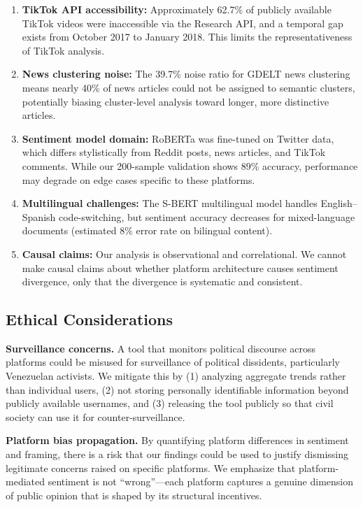 \documentclass[12pt, letterpaper]{article}
\begin{document}
\begin{enumerate}
  \item \textbf{TikTok API accessibility:} Approximately 62.7\% of publicly available TikTok videos were inaccessible via the Research API, and a temporal gap exists from October 2017 to January 2018. This limits the representativeness of TikTok analysis.
  \item \textbf{News clustering noise:} The 39.7\% noise ratio for GDELT news clustering means nearly 40\% of news articles could not be assigned to semantic clusters, potentially biasing cluster-level analysis toward longer, more distinctive articles.
  \item \textbf{Sentiment model domain:} RoBERTa was fine-tuned on Twitter data, which differs stylistically from Reddit posts, news articles, and TikTok comments. While our 200-sample validation shows 89\% accuracy, performance may degrade on edge cases specific to these platforms.
  \item \textbf{Multilingual challenges:} The S-BERT multilingual model handles English--Spanish code-switching, but sentiment accuracy decreases for mixed-language documents (estimated 8\% error rate on bilingual content).
  \item \textbf{Causal claims:} Our analysis is observational and correlational. We cannot make causal claims about whether platform architecture causes sentiment divergence, only that the divergence is systematic and consistent.
\end{enumerate}

\subsection{Ethical Considerations}

\textbf{Surveillance concerns.} A tool that monitors political discourse across platforms could be misused for surveillance of political dissidents, particularly Venezuelan activists. We mitigate this by (1) analyzing aggregate trends rather than individual users, (2) not storing personally identifiable information beyond publicly available usernames, and (3) releasing the tool publicly so that civil society can use it for counter-surveillance.

\textbf{Platform bias propagation.} By quantifying platform differences in sentiment and framing, there is a risk that our findings could be used to justify dismissing legitimate concerns raised on specific platforms. We emphasize that platform-mediated sentiment is not ``wrong''---each platform captures a genuine dimension of public opinion that is shaped by its structural incentives.
\end{document}

